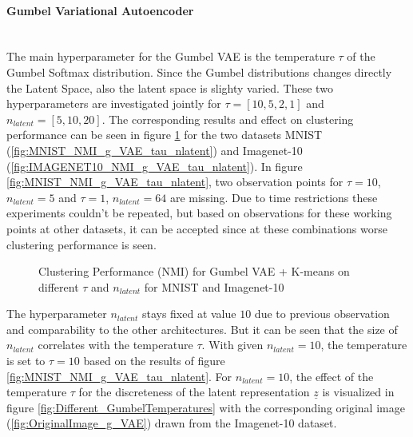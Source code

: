 \documentclass[12pt,DIV14,BCOR12mm,a4paper,footexclude,headinclude,halfparskip-,twoside,openright,cleardoubleempty,idxtotoc,bibtotoc,listtotoc,abstracton]{scrreprt} %
\numberwithin{equation}{chapter}
\begin{document}
	\paragraph{Gumbel Variational Autoencoder}\hfill \\
	The main hyperparameter for the Gumbel VAE is the temperature $\tau$ of the Gumbel Softmax distribution. Since the Gumbel distributions changes directly the Latent Space, also the latent space is slighty varied. These two hyperparameters are investigated jointly for $\tau = [10, 5, 2, 1]$ and $n_{latent} = [5, 10, 20]$. The corresponding results and effect on clustering performance can be seen in figure \ref{fig:ClusterPerformance_g_VAE_Hyperparameters} for the two datasets MNIST (\ref{fig:MNIST_NMI_g_VAE_tau_nlatent}) and Imagenet-10 (\ref{fig:IMAGENET10_NMI_g_VAE_tau_nlatent}). In figure \ref{fig:MNIST_NMI_g_VAE_tau_nlatent}, two observation points for $\tau=10$, $n_{latent}=5$ and $\tau=1$, $n_{latent}=64$ are missing. Due to time restrictions these experiments couldn't be repeated, but based on observations for these working points at other datasets, it can be accepted since at these combinations worse clustering performance is seen.
	 \begin{figure}[htb!]
		\centering
		\qquad
		\caption{Clustering Performance (NMI) for Gumbel VAE + K-means on different $\tau$ and $n_{latent}$ for MNIST and Imagenet-10}
		\label{fig:ClusterPerformance_g_VAE_Hyperparameters}
	\end{figure}
	The hyperparameter $n_{latent}$ stays fixed at value $10$ due to previous observation and comparability to the other architectures. But it can be seen that the size of $n_{latent}$ correlates with the temperature $\tau$. With given $n_{latent}=10$, the temperature is set to $\tau=10$ based on the results of figure \ref{fig:MNIST_NMI_g_VAE_tau_nlatent}. For $n_{latent}=10$, the effect of the temperature $\tau$ for the discreteness of the latent representation $\underline{z}$ is visualized in figure \ref{fig:Different_GumbelTemperatures} with the corresponding original image (\ref{fig:OriginalImage_g_VAE}) drawn from the Imagenet-10 dataset.
\end{document}
